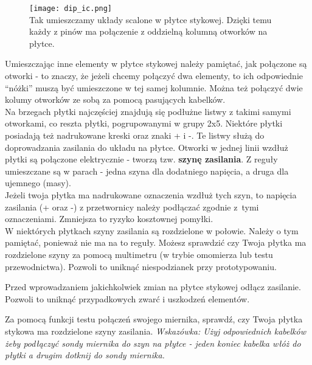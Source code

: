 \documentclass{pdfBooklets}
\begin{document}
\begin{figure}[h!]\begin{Ramka}{}\begin{center}
  \noindent\texttt{[image: dip\_ic.png]}\\
  Tak umieszczamy układy scalone w płytce stykowej. Dzięki temu każdy z pinów ma połączenie z oddzielną kolumną otworków na płytce.
\end{center}\end{Ramka}\end{figure}

Umieszczając inne elementy w płytce stykowej należy pamiętać, jak połączone są otworki - to znaczy, że jeżeli chcemy
połączyć dwa elementy, to ich odpowiednie ``nóżki'' muszą być umieszczone w tej samej kolumnie. Można też połączyć dwie kolumy otworków
ze sobą za pomocą pasujących kabelków.
\\

Na brzegach płytki najczęściej znajdują się podłużne listwy z takimi samymi otworkami, co reszta płytki, pogrupowanymi w grupy 2x5.
Niektóre płytki posiadają też nadrukowane kreski oraz znaki + i -. Te listwy służą do doprowadzania
zasilania do układu na płytce. Otworki w jednej linii wzdłuż płytki są połączone elektrycznie - tworzą tzw.
\textbf{szynę zasilania}. Z reguły umieszczane są w parach - jedna szyna dla dodatniego napięcia, a druga dla ujemnego (masy).\\

Jeżeli twoja płytka ma nadrukowane oznaczenia wzdłuż tych szyn, to napięcia zasilania (+ oraz -) z przetwornicy należy podłączać zgodnie z~tymi
oznaczeniami. Zmniejsza to ryzyko kosztownej pomyłki.\\

W niektórych płytkach szyny zasilania są rozdzielone w połowie. Należy o tym pamiętać, ponieważ nie ma na to reguły.
Możesz sprawdzić czy Twoja płytka ma rozdzielone szyny za pomocą multimetru (w trybie omomierza lub testu przewodnictwa). Pozwoli to uniknąć
niespodzianek przy prototypowaniu.

\begin{ProTip}{}
  Przed wprowadzaniem jakichkolwiek zmian na płytce stykowej odłącz zasilanie. Pozwoli to uniknąć przypadkowych zwarć i uszkodzeń elementów.
\end{ProTip}

\begin{Zadanie}{}{}
  Za pomocą funkcji testu połączeń swojego miernika, sprawdź, czy Twoja płytka stykowa ma rozdzielone szyny zasilania.
  \textit{Wskazówka: Użyj odpowiednich kabelków żeby podłączyć sondy miernika do szyn na płytce - jeden koniec kabelka włóż do płytki a drugim
    dotknij do sondy miernika.}
\end{Zadanie}
\end{document}
